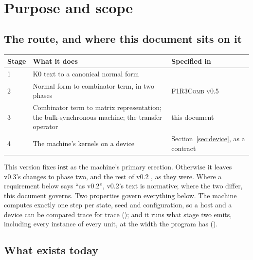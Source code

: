 \documentclass[11pt,a4paper]{article}
\newcommand{\Comb}{\textsc{F1R3Comb}}
\theoremstyle{definition}
\theoremstyle{plain}
\newcommand{\inst}{\mathsf{inst}}
\begin{document}
\tableofcontents

\section{Purpose and scope}\label{sec:purpose}

\subsection{The route, and where this document sits on it}

\begin{center}
\begin{tabularx}{\linewidth}{@{}l>{\raggedright\arraybackslash}Xl@{}}
\toprule
Stage & What it does & Specified in\\
\midrule
1 & K0 text to a canonical normal form & \cite{k1ndl1ng}\\
2 & Normal form to combinator term, in two phases & \Comb{} v0.5 \cite{combspec}\\
3 & Combinator term to matrix representation; the bulk-synchronous machine;
    the transfer operator & this document\\
4 & The machine's kernels on a device & Section~\ref{sec:device}, as a
    contract\\
\bottomrule
\end{tabularx}
\end{center}

\noindent
This version fixes $\inst$ as the machine's primary erection. Otherwise it
leaves v0.3's changes to phase two, and the rest of v0.2 \cite{matv02}, as
they were. Where a requirement below says ``as
v0.2'', v0.2's text is normative; where the two differ, this document
governs. Two properties govern everything below. The machine computes exactly one step
per state, seed and configuration, so a host and a device can be compared
trace for trace (\cite[P4]{matnote}); and it runs what stage two emits,
including every instance of every unit, at the width the program has
(\cite[Princ.~10.4]{matnote}).

\subsection{What exists today}
\end{document}
